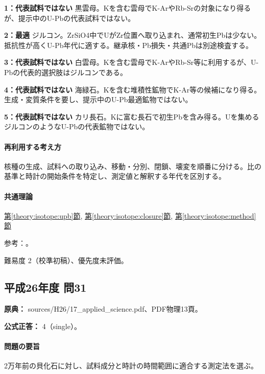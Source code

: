 \noindent\textbf{1：代表試料ではない} 黒雲母。Kを含む雲母でK-ArやRb-Srの対象になり得るが、提示中のU-Pbの代表試料ではない。\par

\noindent\textbf{2：最適} ジルコン。ZrSiO4中でUがZr位置へ取り込まれ、通常初生Pbは少ない。抵抗性が高くU-Pb年代に適する。継承核・Pb損失・共通Pbは別途検査する。\par

\noindent\textbf{3：代表試料ではない} 白雲母。Kを含む雲母でK-ArやRb-Sr等に利用するが、U-Pbの代表的選択肢はジルコンである。\par

\noindent\textbf{4：代表試料ではない} 海緑石。Kを含む堆積性鉱物でK-Ar等の候補になり得る。生成・変質条件を要し、提示中のU-Pb最適鉱物ではない。\par

\noindent\textbf{5：代表試料ではない} カリ長石。Kに富む長石で初生Pbを含み得る。Uを集めるジルコンのようなU-Pbの代表鉱物ではない。\par

\paragraph{再利用する考え方} 核種の生成、試料への取り込み、移動・分別、閉鎖、壊変を順番に分ける。比の基準と時計の開始条件を特定し、測定値と解釈する年代を区別する。

\paragraph{共通理論} \hyperref[theory:isotope:upb]{第\ref*{theory:isotope:upb}節}, \hyperref[theory:isotope:closure]{第\ref*{theory:isotope:closure}節}, \hyperref[theory:isotope:method]{第\ref*{theory:isotope:method}節}

\par 参考：\cite{iso_zircon,iso_radiometric}。

\par 難易度 2（校準初稿）、優先度未評価。

\subsection{平成26年度 問31}
\label{q:h26-reg-applied-31}

\noindent\textbf{原典：} sources/H26/17\_applied\_science.pdf、PDF物理13頁。

\textbf{公式正答：} 4（single）。

\paragraph{問題の要旨} 2万年前の貝化石に対し、試料成分と時計の時間範囲に適合する測定法を選ぶ。

